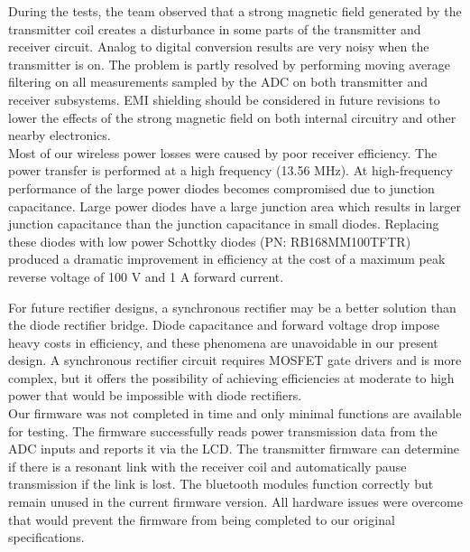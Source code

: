 \documentclass[12pt]{article}
\begin{document}
\indent
During the tests, the team observed that a strong magnetic field generated by the transmitter coil creates a disturbance in some parts of the transmitter and receiver circuit. Analog to digital conversion results are very noisy when the transmitter is on. The problem is partly resolved by performing moving average filtering on all measurements sampled by the ADC on both transmitter and receiver subsystems. EMI shielding should be considered in future revisions to lower the effects of the strong magnetic field on both internal circuitry and other nearby electronics.\\

\indent
Most of our wireless power losses were caused by poor receiver efficiency. The power transfer is performed at a high frequency (13.56 MHz). At high-frequency performance of the large power diodes becomes compromised due to junction capacitance. Large power diodes have a large junction area which results in larger junction capacitance than the junction capacitance in small diodes. Replacing these diodes with low power Schottky diodes (PN: RB168MM100TFTR) produced a dramatic improvement in efficiency at the cost of a maximum peak reverse voltage of 100 V and 1 A forward current. \\
\hfill

\pagebreak
\indent
For future rectifier designs, a synchronous rectifier may be a better solution than the diode rectifier bridge. Diode capacitance and forward voltage drop impose heavy costs in efficiency, and these phenomena are unavoidable in our present design. A synchronous rectifier circuit requires MOSFET gate drivers and is more complex, but it offers the possibility of achieving efficiencies at moderate to high power that would be impossible with diode rectifiers.\\

\indent
Our firmware was not completed in time and only minimal functions are available for testing. The firmware successfully reads power transmission data from the ADC inputs and reports it via the LCD. The transmitter firmware can determine if there is a resonant link with the receiver coil and automatically pause transmission if the link is lost. The bluetooth modules function correctly but remain unused in the current firmware version. All hardware issues were overcome that would prevent the firmware from being completed to our original specifications.\\
\hfill \\
\end{document}
